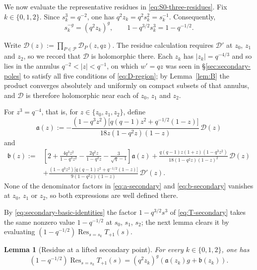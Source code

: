 \documentclass[a4paper,reqno]{amsart}
\numberwithin{equation}{section}
\newtheorem{lemma}[theorem]{Lemma}
\theoremstyle{remark}
\theoremstyle{definition}
\begin{document}
We now evaluate the representative residues in
\eqref{eq:S0-three-residues}. Fix $k\in\{0,1,2\}$. Since $s_k^3=q^{-2}$,
one has $q^2z_k=q^2s_k^2=s_k^{-1}$.
Consequently,
\begin{equation}\label{eq:secondary-basic-identities}
s_k^{-g}=(q^2z_k)^g,
\qquad
1-q^{3/2}s_k^3=1-q^{-1/2}.
\end{equation}

Write $\mathscr D(z):=\prod_{P\in\mathcal P}\mathcal D_P(z,qz)$. The
residue calculation requires $\mathscr D'$ at $z_0$, $z_1$ and $z_2$, so we
record that $\mathscr D$ is holomorphic there. Each $z_k$ has
$|z_k|=q^{-4/3}$ and so lies in the annulus $q^{-2}<|z|<q^{-1}$, on which
$w'=qz$ was seen in \S\ref{sec:secondary-poles} to satisfy all five
conditions of \eqref{eq:D-region}; by Lemma~\ref{lem:B} the product
converges absolutely and uniformly on compact subsets of that annulus, and
$\mathscr D$ is therefore holomorphic near each of $z_0$, $z_1$ and $z_2$.

For $z^3=q^{-4}$, that is, for $z\in\{z_0,z_1,z_2\}$, define
\begin{equation}\label{eq:a-secondary}
\mathfrak a(z)
:=
-\frac{
(1-q^3z^2)
\bigl[q(q-1)z^2+q^{-1/2}(1-z)\bigr]}
{18z(1-q^2z)(1-z)}\,\mathscr D(z)
\end{equation}
and
\begin{align}
\mathfrak b(z)
:={}&
\left[
2+\frac{4q^3z^2}{1-q^3z^2}
-\frac{2q^2z}{1-q^2z}
-\frac{3}{\sqrt q-1}
\right]\mathfrak a(z)
+
\frac{
q(q-1)z(1+z)(1-q^3z^2)}
{18(1-q^2z)(1-z)^2}\,\mathscr D(z)
\nonumber\\
&+
\frac{
(1-q^3z^2)
\bigl[q(q-1)z^2+q^{-1/2}(1-z)\bigr]}
{9(1-q^2z)(1-z)}\,\mathscr D'(z).
\label{eq:b-secondary}
\end{align}
None of the denominator factors in \eqref{eq:a-secondary} and
\eqref{eq:b-secondary} vanishes at $z_0$, $z_1$ or $z_2$, so both
expressions are well defined there.

By \eqref{eq:secondary-basic-identities} the factor $1-q^{3/2}s^3$ of
\eqref{eq:T-secondary} takes the same nonzero value $1-q^{-1/2}$ at $s_0$,
$s_1$, $s_2$; the next lemma clears it by evaluating
$(1-q^{-1/2})\operatorname{Res}_{s=s_k}T_{+1}(s)$.

\begin{lemma}[Residue at a lifted secondary point]
\label{lem:secondary-residue}
For every $k\in\{0,1,2\}$, one has
\begin{equation}\label{eq:secondary-residue-evaluation}
(1-q^{-1/2})
\operatorname{Res}_{s=s_k}T_{+1}(s)
=
(q^2z_k)^g
\left(
\mathfrak a(z_k)g+\mathfrak b(z_k)
\right).
\end{equation}
\end{lemma}
\end{document}
